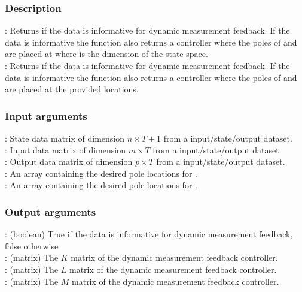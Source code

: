 \subsubsection*{Description} 
: Returns if the data is informative for dynamic measurement feedback. If the data is informative the function also returns a controller  where the poles of  and  are placed at  where  is the dimension of the state space.\\
: Returns if the data is informative for dynamic measurement feedback. If the data is informative the function also returns a controller  where the poles of  and  are placed at the provided locations.

\subsubsection*{Input arguments} 
\textbf{}: State data matrix of dimension $n \times T+1$ from a input/state/output dataset.\\
\textbf{}: Input data matrix of dimension $m \times T$ from a input/state/output dataset.\\
\textbf{}: Output data matrix of dimension $p \times T$ from a input/state/output dataset.\\
\textbf{}: An array containing the desired pole locations for .\\
\textbf{}: An array containing the desired pole locations for .

\subsubsection*{Output arguments} 
\textbf{}: (boolean) True if the data is informative for dynamic measurement feedback, false otherwise\\
\textbf{}: (matrix) The $K$ matrix of the dynamic measurement feedback controller.\\
\textbf{}: (matrix) The $L$ matrix of the dynamic measurement feedback controller.\\
\textbf{}: (matrix) The $M$ matrix of the dynamic measurement feedback controller.

